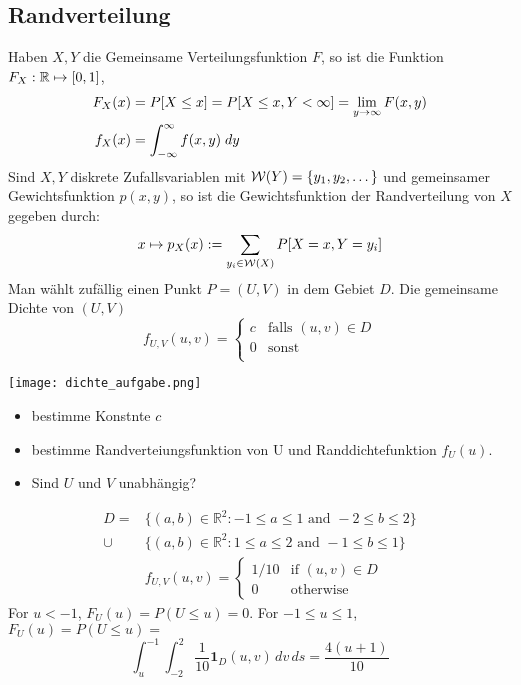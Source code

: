 \subsection*{Randverteilung}
Haben $X, Y$ die Gemeinsame Verteilungsfunktion $F$, so ist die Funktion $F_X:
  \mathbb{R} \mapsto [0, 1]$,
\begin{align*}
  F_X (x) & = P[X \leq x] = P[X \leq x, Y < \infty] = \lim_{y \rightarrow \infty} F (x, y) \\
  f_X (x) & = \int_{-\infty}^\infty f (x, y) \; dy
\end{align*}
Sind $X, Y$ diskrete Zufallsvariablen mit $\mathcal{W} (Y) = \{y_1, y_2, \dots\}$
und gemeinsamer Gewichtsfunktion $p (x, y)$, so ist die Gewichtsfunktion
der Randverteilung von $X$ gegeben durch:
\begin{align*}
  x \mapsto p_X (x) := \sum_{y_i \in \mathcal{W} (X)} P[X = x, Y = y_i]
\end{align*}
\BoxStart{}
Man wählt zufällig einen Punkt $P = (U, V)$ in dem Gebiet $D$. Die gemeinsame Dichte von $(U, V)$
\[
  f_{U, V} (u, v) =
  \begin{cases}
    c & \text{falls } (u, v) \in D \\
    0 & \text{sonst}               \\
  \end{cases}
\]
\begin{center}
  \texttt{[image: dichte\_aufgabe.png]}
\end{center}
\begin{itemize}[noitemsep,topsep=0pt,parsep=0pt,partopsep=0pt]  \item bestimme Konstnte $c$
  \item bestimme Randverteiungsfunktion von U und Randdichtefunktion $f_U(u)$.
  \item Sind $U$ und $V$ unabhängig?
\end{itemize}

\begin{align*}
   D = &\{(a, b) \in \mathbb{R}^2 : -1 \leq a \leq 1 \text{ and } -2 \leq b \leq 2\} \\
   \cup & \{(a, b) \in \mathbb{R}^2 : 1 \leq a \leq 2 \text{ and } -1 \leq b \leq 1\}\\
  & f_{U,V}(u, v) = 
  \begin{cases}
    1/10 & \text{if } (u, v) \in D \\
    0 & \text{otherwise}
  \end{cases}
\end{align*}
For $u < -1$, $F_U(u) = P(U \leq u) = 0$. 
For $-1 \leq u \leq 1$, $F_U(u) = P(U \leq u) = $
\[
  \int_u^{-1} \int_{-2}^{2} \frac{1}{10} \mathbf{1}_D(u, v) \, dv \, ds = \frac{4(u + 1)}{10}
\]

